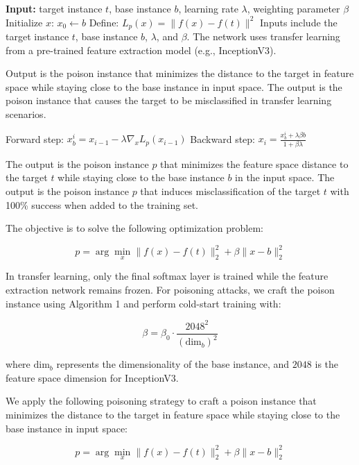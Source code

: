 \STATE \textbf{Input:} target instance $t$, base instance $b$, learning rate $\lambda$, weighting parameter $\beta$
\STATE Initialize $x$: $x_0 \leftarrow b$
\STATE Define: $L_p(x) = \|f(x) - f(t)\|^2$
\STATE Inputs include the target instance $t$, base instance $b$, $\lambda$, and $\beta$. The network uses transfer learning from a pre-trained feature extraction model (e.g., InceptionV3).

\STATE Output is the poison instance that minimizes the distance to the target in feature space while staying close to the base instance in input space.
\STATE The output is the poison instance that causes the target to be misclassified in transfer learning scenarios.

    \STATE Forward step: $x_b^i = x_{i-1} - \lambda \nabla_x L_p(x_{i-1})$
    \STATE Backward step: $x_i = \frac{x_b^i + \lambda \beta b}{1 + \beta \lambda}$
\ENDFOR

\STATE The output is the poison instance $p$ that minimizes the feature space distance to the target $t$ while staying close to the base instance $b$ in the input space.
\STATE The output is the poison instance $p$ that induces misclassification of the target $t$ with 100\% success when added to the training set.

\STATE The objective is to solve the following optimization problem:

\begin{equation}
p = \arg\min_x \|f(x) - f(t)\|_2^2 + \beta \|x - b\|_2^2
\end{equation}

\STATE In transfer learning, only the final softmax layer is trained while the feature extraction network remains frozen. For poisoning attacks, we craft the poison instance using Algorithm 1 and perform cold-start training with:

\begin{equation}
\beta = \beta_0 \cdot \frac{2048^2}{(\text{dim}_b)^2}
\end{equation}

\STATE where $\text{dim}_b$ represents the dimensionality of the base instance, and $2048$ is the feature space dimension for InceptionV3.

\STATE We apply the following poisoning strategy to craft a poison instance that minimizes the distance to the target in feature space while staying close to the base instance in input space:

\begin{equation}
p = \arg\min_x \|f(x) - f(t)\|_2^2 + \beta \|x - b\|_2^2
\end{equation}

